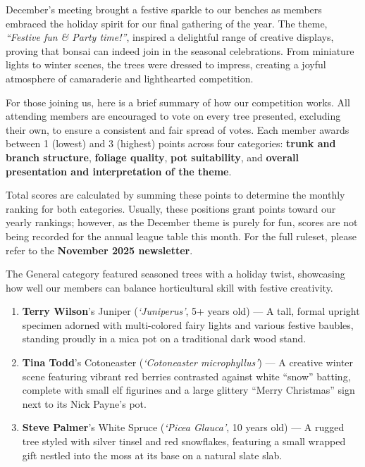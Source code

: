 \label{2025-12-totm}
\noindent
December's meeting brought a festive sparkle to our benches as members embraced the holiday spirit for our final gathering of the year.
The theme, \textit{``Festive fun \& Party time!''}, inspired a delightful range of creative displays, proving that bonsai can indeed join in the seasonal celebrations.
From miniature lights to winter scenes, the trees were dressed to impress, creating a joyful atmosphere of camaraderie and lighthearted competition.

\medskip
\noindent
For those joining us, here is a brief summary of how our competition works.
All attending members are encouraged to vote on every tree presented, excluding their own, to ensure a consistent and fair spread of votes.
Each member awards between 1 (lowest) and 3 (highest) points across four categories: \textbf{trunk and branch structure}, \textbf{foliage quality}, \textbf{pot suitability}, and \textbf{overall presentation and interpretation of the theme}.

\noindent
Total scores are calculated by summing these points to determine the monthly ranking for both categories.
Usually, these positions grant points toward our yearly rankings; however, as the December theme is purely for fun, scores are not being recorded for the annual league table this month.
For the full ruleset, please refer to the \textbf{November 2025 newsletter}.

\medskip
{}
\noindent
The General category featured seasoned trees with a holiday twist, showcasing how well our members can balance horticultural skill with festive creativity.

\begin{enumerate}
    \item \textbf{Terry Wilson}'s Juniper (\textit{`Juniperus'}, 5+ years old) --- A tall, formal upright specimen adorned with multi\--colored fairy lights and various festive baubles, standing proudly in a mica pot on a traditional dark wood stand.
    \item \textbf{Tina Todd}'s Cotoneaster (\textit{`Cotoneaster microphyllus'}) --- A creative winter scene featuring vibrant red berries contrasted against white ``snow'' batting, complete with small elf figurines and a large glittery ``Merry Christmas'' sign next to its Nick Payne's pot.
    \item \textbf{Steve Palmer}'s White Spruce (\textit{`Picea Glauca'}, 10 years old) --- A rugged tree styled with silver tinsel and red snowflakes, featuring a small wrapped gift nestled into the moss at its base on a natural slate slab.
\end{enumerate}

